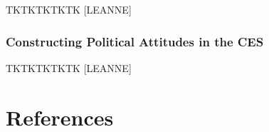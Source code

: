 \documentclass[
  12pt,
]{article}
\begin{document}
TKTKTKTKTK {[}LEANNE{]}

\hypertarget{constructing-political-attitudes-in-the-ces}{%
\subsubsection*{Constructing Political Attitudes in the CES}\label{constructing-political-attitudes-in-the-ces}}

TKTKTKTKTK {[}LEANNE{]}

\newpage

\hypertarget{references}{%
\section*{References}\label{references}}
\end{document}
